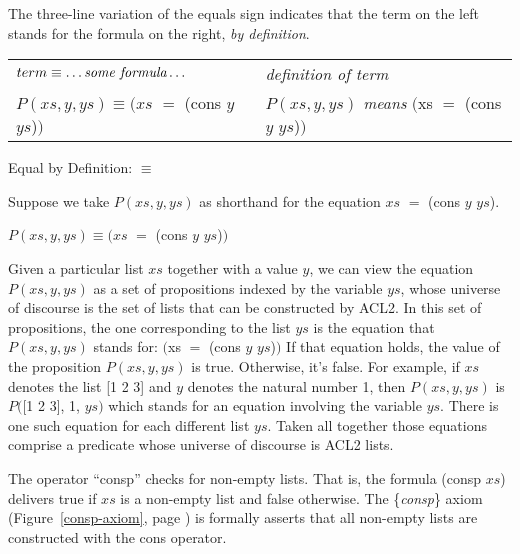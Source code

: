 \begin{aside}
The
three-line
variation of the equals sign
indicates that the term on the left stands
for the formula on the right, \emph{by definition}.
\begin{center}
\begin{tabular}{ll}
$term \equiv \dots \emph{some formula} \dots$    &\emph{definition of term} \\
$P(xs, y, ys) \equiv (xs$ $=$ (cons $y$ $ys$)$)$ &$P(xs, y, ys)$ \emph{means} $($xs $=$ (cons $y$ $ys$)$)$  \\
\end{tabular}
\end{center}
\caption{Equal by Definition: $\equiv$}
\label{three-line-equal}
\end{aside}

Suppose we take $P(xs, y, ys)$ as shorthand
for the equation $xs$ $=$ (cons $y$ $ys$).
\begin{center}
$P(xs, y, ys) \equiv (xs$ $=$ (cons $y$ $ys$)$)$
\end{center}

Given a particular list $xs$ together with a value $y$,
we can view the equation $P(xs, y, ys)$ as a set of propositions
indexed by the variable $ys$, whose universe of discourse is the set of
lists that can be constructed by ACL2.
In this set of propositions, the one corresponding to
the list $ys$ is the equation that $P(xs, y, ys)$ stands for:
$($xs $=$ (cons $y$ $ys$)$)$
If that equation holds, the value of the proposition $P(xs, y, ys)$ is true.
Otherwise, it's false.
For example, if $xs$ denotes the list [1 2 3]
and $y$ denotes the natural number 1,
then $P(xs, y, ys)$ is $P($[1 2 3], 1, $ys)$
which stands for an equation involving the variable $ys$.
There is one such equation for each different list $ys$.
Taken all together those equations comprise a predicate
whose universe of discourse is ACL2 lists.

The operator 
``consp''
checks for non-empty lists.
That is, the formula (consp $xs$) delivers true
if $xs$ is a non-empty list and false otherwise.
The \{\emph{consp}\} axiom
(Figure~\ref{consp-axiom}, page \pageref{consp-axiom})
is formally asserts that all non-empty lists
are constructed with the cons operator.

